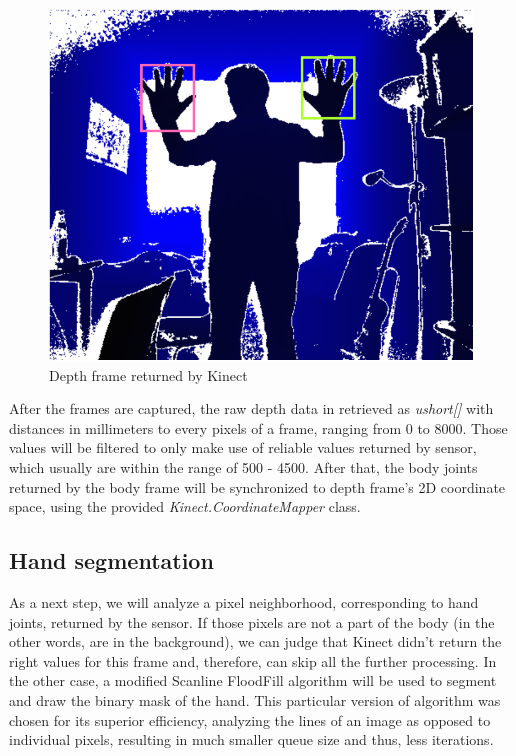 \documentclass[a4paper,11pt,oneside]{article}
\begin{document}
  \begin{figure}[H]
  \centering
  \includegraphics[scale=0.70]{depth-frame.png}
\caption{Depth frame returned by Kinect}
\end{figure}

After the frames are captured, the raw depth data in retrieved as \textit{ushort[]} with distances in millimeters to every pixels of a frame, ranging from 0 to 8000. Those values will be filtered to only make use of reliable values returned by sensor, which usually are within the range of 500 - 4500. After that, the body joints returned by the body frame will be synchronized to depth frame's 2D coordinate space, using the provided \textit{Kinect.CoordinateMapper} class.

  \subsection{Hand segmentation}
  
As a next step, we will analyze a pixel neighborhood, corresponding to hand joints, returned by the sensor. If those pixels are not a part of the body (in the other words, are in the background), we can judge that Kinect didn't return the right values for this frame and, therefore, can skip all the further processing. In the other case, a modified Scanline FloodFill algorithm will be used to segment and draw the binary mask of the hand. This particular version of algorithm was chosen for its superior efficiency, analyzing the lines of an image as opposed to individual pixels, resulting in much smaller queue size and thus, less iterations.\\
\end{document}
